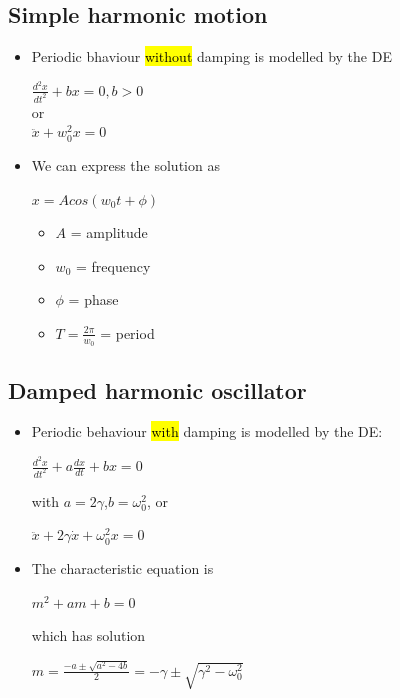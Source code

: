 \documentclass{article}
\begin{document}
    \subsection*{Simple harmonic motion}
    \begin{itemize}
      \item Periodic bhaviour \hl{without} damping is modelled by the DE
        \begin{center}
        $\frac{d^2x}{dt^2} + bx = 0,b>0$\\
        or\\
        $\ddot{x} + w_{0}^2x = 0$
        \end{center}

      \item We can express the solution as 
        \begin{center}
          $x = Acos(w_0t + \phi)$
        \end{center}
        \begin{itemize}
          \item $A$ = amplitude
          \item $w_0$ = frequency
          \item $\phi$ =  phase
          \item $T = \frac{2 \pi}{w_0}$ = period
        \end{itemize}
    \end{itemize}

    \subsection*{Damped harmonic oscillator}
    \begin{itemize}
      \item Periodic behaviour \hl{with} damping is  modelled by the DE:
        \begin{center}
          $\frac{d^2x}{dt^2} + a \frac{dx}{dt} + bx = 0$
        \end{center}

        with $a = 2 \gamma$,$b = \omega_0^2$, or
        \begin{center}
          $\ddot{x} + 2 \gamma \dot{x} + \omega_0^{2}x = 0$
        \end{center}

      \item The characteristic equation is 
        \begin{center}
          $m^2 + am + b = 0$
        \end{center}
        which has solution 
        \begin{center}
          $ m = \frac{-a \pm \sqrt{a^2 - 4b}}{2} = - \gamma \pm \sqrt{\gamma^2 - \omega_0^2}$
        \end{center}

    \end{itemize}
\end{document}
